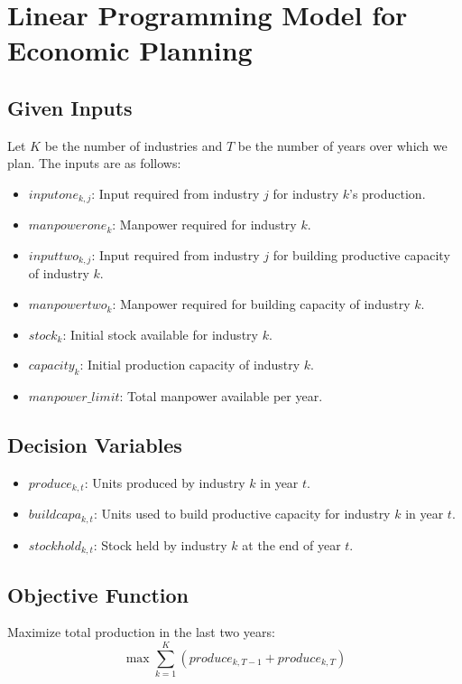 \documentclass{article}
\begin{document}
\section*{Linear Programming Model for Economic Planning}

\subsection*{Given Inputs}
Let \( K \) be the number of industries and \( T \) be the number of years over which we plan. The inputs are as follows:
\begin{itemize}
    \item \( inputone_{k,j} \): Input required from industry \( j \) for industry \( k \)'s production.
    \item \( manpowerone_{k} \): Manpower required for industry \( k \).
    \item \( inputtwo_{k,j} \): Input required from industry \( j \) for building productive capacity of industry \( k \).
    \item \( manpowertwo_{k} \): Manpower required for building capacity of industry \( k \).
    \item \( stock_{k} \): Initial stock available for industry \( k \).
    \item \( capacity_{k} \): Initial production capacity of industry \( k \).
    \item \( manpower\_limit \): Total manpower available per year.
\end{itemize}

\subsection*{Decision Variables}
\begin{itemize}
    \item \( produce_{k,t} \): Units produced by industry \( k \) in year \( t \).
    \item \( buildcapa_{k,t} \): Units used to build productive capacity for industry \( k \) in year \( t \).
    \item \( stockhold_{k,t} \): Stock held by industry \( k \) at the end of year \( t \).
\end{itemize}

\subsection*{Objective Function}
Maximize total production in the last two years:
\[
\max \sum_{k=1}^{K} \left( produce_{k,T-1} + produce_{k,T} \right)
\]
\end{document}
